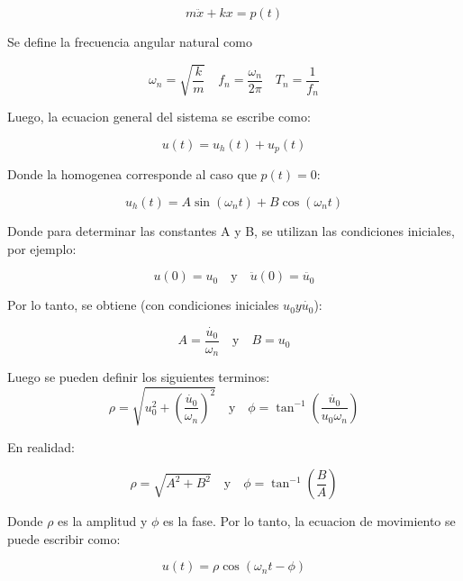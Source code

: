 \documentclass{article}  %
\begin{document}
\begin{equation}
    m \ddot{x} + kx = p(t)
\end{equation}

Se define la frecuencia angular natural como

\begin{equation}
    \omega_n = \sqrt{\frac{k}{m}} \quad f_n = \frac{\omega_n}{2\pi} \quad T_n = \frac{1}{f_n} 
\end{equation}

Luego, la ecuacion general del sistema se escribe como:

\begin{equation}
    u(t) = u_h(t) + u_p(t)
\end{equation}

Donde la homogenea corresponde al caso que $p(t) = 0$:

\begin{equation}
    u_h(t) = A \sin(\omega_n t) + B \cos(\omega_n t)
\end{equation}

Donde para determinar las constantes A y B, se utilizan las condiciones iniciales, por ejemplo:

\begin{equation}
    u(0) = u_0 \quad \text{y} \quad \ddot{u}(0) = \ddot{u_0}
\end{equation}

Por lo tanto, se obtiene (con condiciones iniciales $u_0 y \dot{u_0}$):

\begin{equation}
    A = \frac{\dot{u_0}}{\omega_n} \quad \text{y} \quad B = u_0
\end{equation}

Luego se pueden definir los siguientes terminos:
\begin{equation}
    \rho = \sqrt{u_0^2 + (\frac{\dot{u_0}}{\omega_n})^2} \quad \text{y} \quad \phi = \tan^{-1}(\frac{\dot{u_0}}{u_0 \omega_n})
\end{equation}

En realidad:

\begin{equation}
    \rho = \sqrt{A^2 + B^2} \quad \text{y} \quad \phi = \tan^{-1}(\frac{B}{A})
\end{equation}

Donde $\rho$ es la amplitud y $\phi$ es la fase. Por lo tanto, la ecuacion de movimiento se puede escribir como:

\begin{equation}
    u(t) = \rho \cos(\omega_n t - \phi)
\end{equation}
\end{document}
